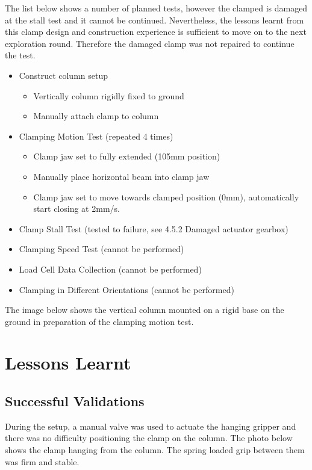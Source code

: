 The list below shows a number of planned tests, however the clamped is damaged at the stall test and it cannot be continued. Nevertheless, the lessons learnt from this clamp design and construction experience is sufficient to move on to the next exploration round. Therefore the damaged clamp was not repaired to continue the test.
\begin{itemize}
    \item Construct column setup
    \begin{itemize}
        \item Vertically column rigidly fixed to ground
        \item Manually attach clamp to column
    \end{itemize}
    \item Clamping Motion Test (repeated 4 times)
    \begin{itemize}
        \item Clamp jaw set to fully extended (105mm position)
        \item Manually place horizontal beam into clamp jaw 
        \item Clamp jaw set to move towards clamped position (0mm), automatically start closing at 2mm/s.
    \end{itemize}
    \item Clamp Stall Test (tested to failure, see 4.5.2 Damaged actuator gearbox)
    \item Clamping Speed Test (cannot be performed)
    \item Load Cell Data Collection (cannot be performed)
    \item Clamping in Different Orientations (cannot be performed)
\end{itemize}

    The image below shows the vertical column mounted on a rigid base on the ground in preparation of the clamping motion test.

\section{Lessons Learnt}
\label{section:exploration_1_lessions_learnt}

\subsection{Successful Validations}
\label{subsection:exploration_1_successful_validations}

During the setup, a manual valve was used to actuate the hanging gripper and there was no difficulty positioning the clamp on the column. The photo below shows the clamp hanging from the column. The spring loaded grip between them was firm and stable. 

